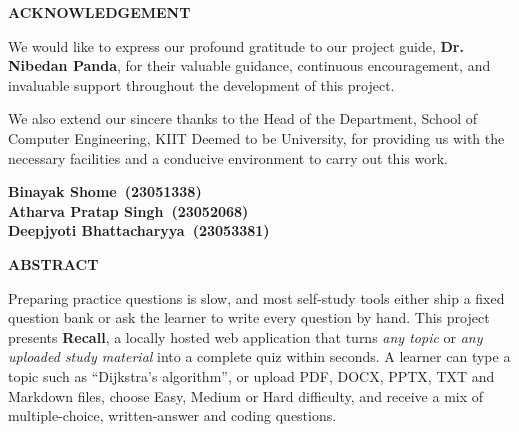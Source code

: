 \documentclass[12pt, a4paper]{report}
\newcommand{\GuideName}{Dr. Nibedan Panda}
\newcommand{\MemberOne}{Binayak Shome}   \newcommand{\RollOne}{23051338}
\newcommand{\MemberTwo}{Atharva Pratap Singh}   \newcommand{\RollTwo}{23052068}
\newcommand{\MemberThree}{Deepjyoti Bhattacharyya} \newcommand{\RollThree}{23053381}
\begin{document}
\newpage
{}
{}
\begin{center}
{\LARGE \textbf{ACKNOWLEDGEMENT}}\\[1cm]
\end{center}

We would like to express our profound gratitude to our project guide, \textbf{\GuideName}, for their valuable guidance, continuous encouragement, and invaluable support throughout the development of this project.

\par\vspace{0.5cm}
We also extend our sincere thanks to the Head of the Department, School of Computer Engineering, KIIT Deemed to be University, for providing us with the necessary facilities and a conducive environment to carry out this work.

\vfill
\begin{flushright}
\textbf{\MemberOne\ (\RollOne)}\\[0.15cm]
\textbf{\MemberTwo\ (\RollTwo)}\\[0.15cm]
\textbf{\MemberThree\ (\RollThree)}\\[0.15cm]
\end{flushright}
\vspace*{1cm}

\newpage
{}
{}
\begin{center}
{\LARGE \textbf{ABSTRACT}}\\[1cm]
\end{center}

Preparing practice questions is slow, and most self-study tools either ship a fixed question bank or ask the learner to write every question by hand. This project presents \textbf{Recall}, a locally hosted web application that turns \textit{any topic} or \textit{any uploaded study material} into a complete quiz within seconds. A learner can type a topic such as ``Dijkstra's algorithm'', or upload PDF, DOCX, PPTX, TXT and Markdown files, choose Easy, Medium or Hard difficulty, and receive a mix of multiple-choice, written-answer and coding questions.
\end{document}
